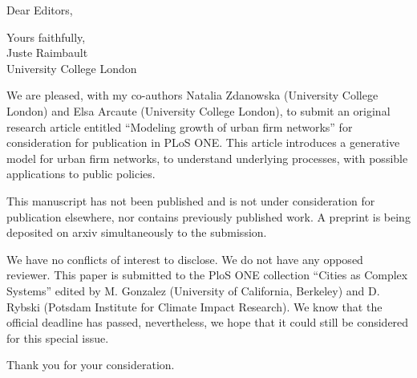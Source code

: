 \documentclass[11pt,a4paper,sans]{moderncv}        %
\begin{document}

\date{September 11th, 2020}
\opening{Dear Editors,}
\closing{Yours faithfully,\\
Juste Raimbault\\
University College London
}
\makelettertitle

\justify
We are pleased, with my co-authors Natalia Zdanowska (University College London) and Elsa Arcaute (University College London), to submit an original research article entitled ``Modeling growth of urban firm networks'' for consideration for publication in PLoS ONE. This article introduces a generative model for urban firm networks, to understand underlying processes, with possible applications to public policies. %

This manuscript has not been published and is not under consideration for publication elsewhere, nor contains previously published work. A preprint is being deposited on arxiv simultaneously to the submission.

We have no conflicts of interest to disclose. We do not have any opposed reviewer. This paper is submitted to the PloS ONE collection ``Cities as Complex Systems'' edited by M. Gonzalez (University of California, Berkeley) and D. Rybski (Potsdam Institute for Climate Impact Research). We know that the official deadline has passed, nevertheless, we hope that it could still be considered for this special issue.


Thank you for your consideration.
\justify




\makeletterclosing
\end{document}
